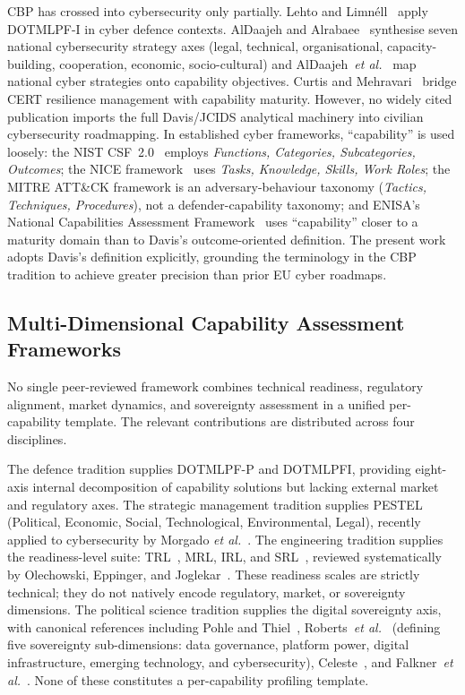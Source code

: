 CBP has crossed into cybersecurity only partially. Lehto and
Limn\'{e}ll~\cite{lehto2022} apply DOTMLPF-I in cyber defence contexts.
AlDaajeh and Alrabaee~\cite{aldaajeh2024} synthesise seven national
cybersecurity strategy axes (legal, technical, organisational,
capacity-building, cooperation, economic, socio-cultural) and
AlDaajeh~\textit{et al.}~\cite{aldaajeh2022} map national cyber
strategies onto capability objectives. Curtis and
Mehravari~\cite{curtis2015} bridge CERT resilience management with
capability maturity. However, no widely cited publication imports the
full Davis/JCIDS analytical machinery into civilian cybersecurity
roadmapping. In established cyber frameworks, ``capability'' is used
loosely: the NIST CSF~2.0~\cite{nist_csf2} employs \textit{Functions,
Categories, Subcategories, Outcomes}; the NICE
framework~\cite{nist_nice} uses \textit{Tasks, Knowledge, Skills, Work
Roles}; the MITRE ATT\&CK framework is an adversary-behaviour taxonomy
(\textit{Tactics, Techniques, Procedures}), not a defender-capability
taxonomy; and ENISA's National Capabilities Assessment
Framework~\cite{enisa_ncaf} uses ``capability'' closer to a maturity
domain than to Davis's outcome-oriented definition. The present work
adopts Davis's definition explicitly, grounding the terminology in the
CBP tradition to achieve greater precision than prior EU cyber roadmaps.

\subsection{Multi-Dimensional Capability Assessment Frameworks}
\label{sec:rw_multidim}

No single peer-reviewed framework combines technical readiness,
regulatory alignment, market dynamics, and sovereignty assessment in a
unified per-capability template. The relevant contributions are
distributed across four disciplines.

The defence tradition supplies DOTMLPF-P and DOTMLPFI, providing
eight-axis internal decomposition of capability solutions but lacking
external market and regulatory axes. The strategic management tradition
supplies PESTEL (Political, Economic, Social, Technological,
Environmental, Legal), recently applied to cybersecurity by Morgado
\textit{et al.}~\cite{morgado2021}. The engineering tradition supplies
the readiness-level suite: TRL~\cite{mankins1995}, MRL, IRL, and
SRL~\cite{sauser2008}, reviewed systematically by Olechowski, Eppinger,
and Joglekar~\cite{olechowski2015}. These readiness scales are strictly
technical; they do not natively encode regulatory, market, or sovereignty
dimensions. The political science tradition supplies the digital
sovereignty axis, with canonical references including Pohle and
Thiel~\cite{pohle2020}, Roberts~\textit{et al.}~\cite{roberts2021}
(defining five sovereignty sub-dimensions: data governance, platform
power, digital infrastructure, emerging technology, and cybersecurity),
Celeste~\cite{celeste2023}, and Falkner~\textit{et al.}~\cite{falkner2024}.
None of these constitutes a per-capability profiling template.

